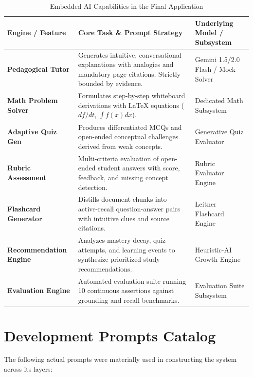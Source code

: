\documentclass[11pt,a4paper]{article}
\begin{document}
\begin{table}[h!]
\centering
\small
\begin{tabularx}{\textwidth}{lXl}
\toprule
\textbf{Engine / Feature} & \textbf{Core Task \& Prompt Strategy} & \textbf{Underlying Model / Subsystem} \\
\midrule
\textbf{Pedagogical Tutor} & Generates intuitive, conversational explanations with analogies and mandatory page citations. Strictly bounded by evidence. & Gemini 1.5/2.0 Flash / Mock Solver \\
\textbf{Math Problem Solver} & Formulates step-by-step whiteboard derivations with LaTeX equations ($df/dt$, $\int f(x)dx$). & Dedicated Math Subsystem \\
\textbf{Adaptive Quiz Gen} & Produces differentiated MCQs and open-ended conceptual challenges derived from weak concepts. & Generative Quiz Evaluator \\
\textbf{Rubric Assessment} & Multi-criteria evaluation of open-ended student answers with score, feedback, and missing concept detection. & Rubric Evaluator Engine \\
\textbf{Flashcard Generator} & Distills document chunks into active-recall question-answer pairs with intuitive clues and source citations. & Leitner Flashcard Engine \\
\textbf{Recommendation Engine} & Analyzes mastery decay, quiz attempts, and learning events to synthesize prioritized study recommendations. & Heuristic-AI Growth Engine \\
\textbf{Evaluation Engine} & Automated evaluation suite running 10 continuous assertions against grounding and recall benchmarks. & Evaluation Suite Subsystem \\
\bottomrule
\end{tabularx}
\caption{Embedded AI Capabilities in the Final Application}
\end{table}

\section{Development Prompts Catalog}

The following actual prompts were materially used in constructing the system across its layers:
\end{document}
